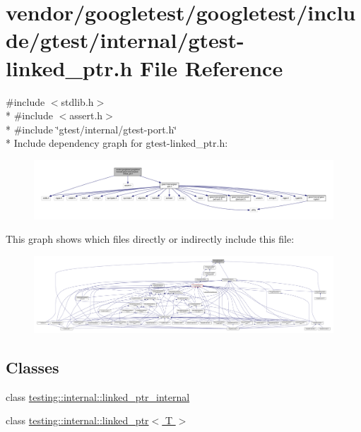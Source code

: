 \hypertarget{gtest-linked__ptr_8h}{}\section{vendor/googletest/googletest/include/gtest/internal/gtest-\/linked\+\_\+ptr.h File Reference}
\label{gtest-linked__ptr_8h}
{\ttfamily \#include $<$stdlib.\+h$>$}\\*
{\ttfamily \#include $<$assert.\+h$>$}\\*
{\ttfamily \#include \char`\"{}gtest/internal/gtest-\/port.\+h\char`\"{}}\\*
Include dependency graph for gtest-\/linked\+\_\+ptr.h\+:
\nopagebreak
\begin{figure}[H]
\begin{center}
\leavevmode
\includegraphics[width=350pt]{gtest-linked__ptr_8h__incl}
\end{center}
\end{figure}
This graph shows which files directly or indirectly include this file\+:
\nopagebreak
\begin{figure}[H]
\begin{center}
\leavevmode
\includegraphics[width=350pt]{gtest-linked__ptr_8h__dep__incl}
\end{center}
\end{figure}
\subsection*{Classes}
\begin{DoxyCompactItemize}
\item 
class \hyperlink{classtesting_1_1internal_1_1linked__ptr__internal}{testing\+::internal\+::linked\+\_\+ptr\+\_\+internal}
\item 
class \hyperlink{classtesting_1_1internal_1_1linked__ptr}{testing\+::internal\+::linked\+\_\+ptr$<$ T $>$}
\end{DoxyCompactItemize}
